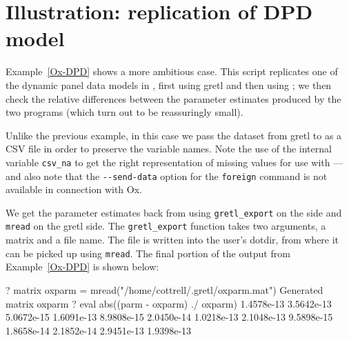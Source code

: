 \section{Illustration: replication of DPD model}
\label{sec:dpd-replication}

Example~\ref{Ox-DPD} shows a more ambitious case.  This script
replicates one of the dynamic panel data models in
\cite{arellano-bond91}, first using gretl and then using ; we
then check the relative differences between the parameter estimates
produced by the two programs (which turn out to be reassuringly
small).

Unlike the previous example, in this case we pass the dataset from
gretl to  as a CSV file in order to preserve the
variable names.  Note the use of the internal variable \verb|csv_na|
to get the right representation of missing values for use with
---and also note that the \verb|--send-data| option for the
\texttt{foreign} command is not available in connection with Ox.

We get the parameter estimates back from  using
\verb|gretl_export| on the  side and \texttt{mread} on the
gretl side.  The \verb|gretl_export| function takes two
arguments, a matrix and a file name.  The file is written into the
user's dotdir, from where it can be picked up using \texttt{mread}.
The final portion of the output from Example~\ref{Ox-DPD} is shown
below:
%
\begin{code}
? matrix oxparm = mread("/home/cottrell/.gretl/oxparm.mat")
Generated matrix oxparm
? eval abs((parm - oxparm) ./ oxparm)
  1.4578e-13 
  3.5642e-13 
  5.0672e-15 
  1.6091e-13 
  8.9808e-15 
  2.0450e-14 
  1.0218e-13 
  2.1048e-13 
  9.5898e-15 
  1.8658e-14 
  2.1852e-14 
  2.9451e-13 
  1.9398e-13 
\end{code}

